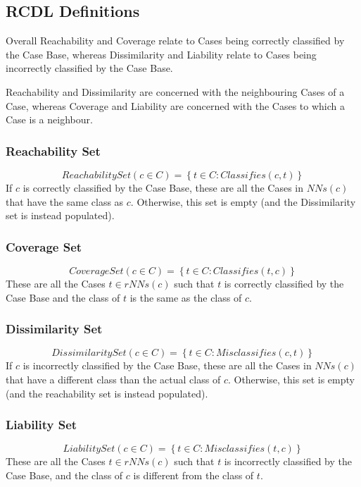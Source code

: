 \documentclass[a4paper,11pt]{report}
\begin{document}
\subsection{RCDL Definitions}
Overall Reachability and Coverage relate to Cases being correctly classified by the Case Base, whereas Dissimilarity and Liability relate to Cases being incorrectly classified by the Case Base.

Reachability and Dissimilarity are concerned with the neighbouring Cases of a Case, whereas Coverage and Liability are concerned with the Cases to which a Case is a neighbour.

\subsubsection{Reachability Set}
\[ ReachabilitySet(c \in C) = \left\lbrace t \in C : Classifies(c, t) \right\rbrace \] 
If $c$ is correctly classified by the Case Base, these are all the Cases in $ NNs(c) $ that have the same class as $c$. Otherwise, this set is empty (and the Dissimilarity set is instead populated).

\subsubsection{Coverage Set}
\[ CoverageSet(c \in C) = \left\lbrace t \in C : Classifies(t, c) \right\rbrace \]
These are all the Cases $ t \in rNNs(c) $ such that $t$ is correctly classified by the Case Base and the class of $t$ is the same as the class of $c$.

\subsubsection{Dissimilarity Set}
\[ DissimilaritySet(c \in C) = \left\lbrace t \in C : Misclassifies(c, t) \right\rbrace \]  
If $c$ is incorrectly classified by the Case Base, these are all the Cases in $ NNs(c) $ that have a different class than the actual class of $c$. Otherwise, this set is empty (and the reachability set is instead populated).

\subsubsection{Liability Set}
\[ LiabilitySet(c \in C) = \left\lbrace t \in C : Misclassifies(t, c) \right\rbrace \]  
These are all the Cases $ t \in rNNs(c) $ such that $t$ is incorrectly classified by the Case Base, and the class of $c$ is different from the class of $t$.
\end{document}
